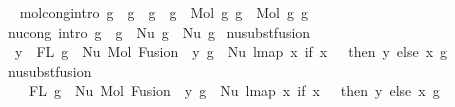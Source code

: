 \begin{isabellebody}
\isanewline
\ \isanewline
{\isacharbar}{\kern0pt}\ mol{\isacharunderscore}{\kern0pt}cong{\isacharbrackleft}{\kern0pt}intro{\isacharbrackright}{\kern0pt}{\isacharcolon}{\kern0pt}\ {\isachardoublequoteopen}g{}\ {\isasymsimeq}\ g{}{\isacharprime}{\kern0pt}\ {\isacharequal}{\kern0pt}{\isacharequal}{\kern0pt}{\isachargreater}{\kern0pt}\ g{}\ {\isasymsimeq}\ g{}{\isacharprime}{\kern0pt}\ {\isacharequal}{\kern0pt}{\isacharequal}{\kern0pt}{\isachargreater}{\kern0pt}\ Mol\ g{}\ g{}\ {\isasymsimeq}\ Mol\ g{}{\isacharprime}{\kern0pt}\ g{}{\isacharprime}{\kern0pt}{\isachardoublequoteclose}\isanewline
{\isacharbar}{\kern0pt}\ nu{\isacharunderscore}{\kern0pt}cong\ {\isacharbrackleft}{\kern0pt}intro{\isacharbrackright}{\kern0pt}{\isacharcolon}{\kern0pt}\ {\isachardoublequoteopen}g\ {\isasymsimeq}\ g{\isacharprime}{\kern0pt}\ {\isacharequal}{\kern0pt}{\isacharequal}{\kern0pt}{\isachargreater}{\kern0pt}\ Nu\ g\ {\isasymsimeq}\ Nu\ g{\isacharprime}{\kern0pt}{\isachardoublequoteclose}\isanewline
\isanewline
\isanewline
\isanewline
{\isacharbar}{\kern0pt}\ nu{\isacharunderscore}{\kern0pt}subst{\isacharunderscore}{\kern0pt}fusion{}{\isacharcolon}{\kern0pt}\isanewline
\ \ {\isachardoublequoteopen}y\ {\isasymin}\ FL\ g\ {\isacharequal}{\kern0pt}{\isacharequal}{\kern0pt}{\isachargreater}{\kern0pt}\ Nu\ {\isacharparenleft}{\kern0pt}Mol\ {\isacharparenleft}{\kern0pt}Fusion\ {}\ y{\isacharparenright}{\kern0pt}\ g{\isacharparenright}{\kern0pt}\ {\isasymsimeq}\ Nu\ {\isacharparenleft}{\kern0pt}lmap\ {\isacharparenleft}{\kern0pt}{\isasymlambda}x{\isachardot}{\kern0pt}\ if\ x\ {\isacharequal}{\kern0pt}\ {}\ then\ y\ else\ x{\isacharparenright}{\kern0pt}\ g{\isacharparenright}{\kern0pt}{\isachardoublequoteclose}\isanewline
{\isacharbar}{\kern0pt}\ nu{\isacharunderscore}{\kern0pt}subst{\isacharunderscore}{\kern0pt}fusion{}{\isacharcolon}{\kern0pt}\isanewline
\ \ {\isachardoublequoteopen}{}\ {\isasymin}\ FL\ g\ {\isacharequal}{\kern0pt}{\isacharequal}{\kern0pt}{\isachargreater}{\kern0pt}\ Nu\ {\isacharparenleft}{\kern0pt}Mol\ {\isacharparenleft}{\kern0pt}Fusion\ {}\ y{\isacharparenright}{\kern0pt}\ g{\isacharparenright}{\kern0pt}\ {\isasymsimeq}\ Nu\ {\isacharparenleft}{\kern0pt}lmap\ {\isacharparenleft}{\kern0pt}{\isasymlambda}x{\isachardot}{\kern0pt}\ if\ x\ {\isacharequal}{\kern0pt}\ {}\ then\ y\ else\ x{\isacharparenright}{\kern0pt}\ g{\isacharparenright}{\kern0pt}{\isachardoublequoteclose}\isanewline
\isanewline

\end{isabellebody}
